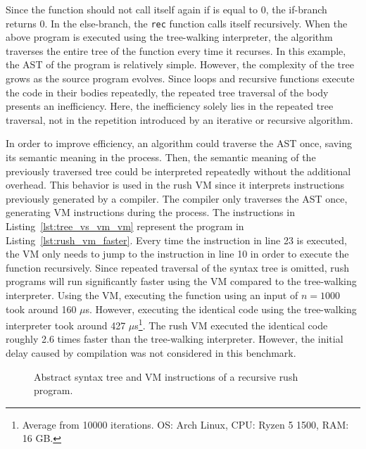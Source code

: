 Since the function should not call itself again if  is equal to 0, the if-branch returns 0.
In the else-branch, the \texttt{rec} function calls itself recursively.
When the above program is executed using the tree-walking interpreter, the algorithm traverses the entire tree of the  function every time it recurses.
In this example, the AST of the program is relatively simple.
However, the complexity of the tree grows as the source program evolves.
Since loops and recursive functions execute the code in their bodies repeatedly, the repeated tree traversal of the body presents an inefficiency.
Here, the inefficiency solely lies in the repeated tree traversal, not in the repetition introduced by an iterative or recursive algorithm.

In order to improve efficiency, an algorithm could traverse the AST once, saving its semantic meaning in the process.
Then, the semantic meaning of the previously traversed tree could be interpreted repeatedly without the additional overhead.
This behavior is used in the rush VM since it interprets instructions previously generated by a compiler.
The compiler only traverses the AST once, generating VM instructions during the process.
The instructions in Listing~\ref{lst:tree_vs_vm_vm} represent the program in Listing~\ref{lst:rush_vm_faster}.
Every time the  instruction in line 23 is executed, the VM only needs to jump to the instruction in line 10 in order to execute the  function recursively.
Since repeated traversal of the syntax tree is omitted, rush programs will run significantly faster using the VM compared to the tree-walking interpreter.
Using the VM, executing the  function using an input of $n = 1000$ took around 160 $\mu$s.
However, executing the identical code using the tree-walking interpreter took around 427 $\mu$s\footnote{Average from 10000 iterations. OS: Arch Linux, CPU: Ryzen 5 1500, RAM: 16 GB.}.
The rush VM executed the identical code roughly 2.6 times faster than the tree-walking interpreter.
However, the initial delay caused by compilation was not considered in this benchmark.

\begin{wrapfigure}{R}{.56\textwidth}
	\begin{adjustbox}{max totalsize={\textwidth}{!},center}
	\end{adjustbox}
	\caption{Abstract syntax tree and VM instructions of a recursive rush program.}\label{fig:tree_vs_vm_tree}
\end{wrapfigure}

